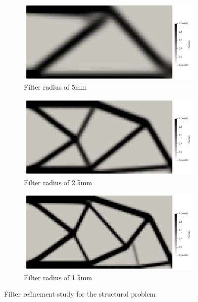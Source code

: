 \begin{figure}[ht]
  \centering
  \begin{subfigure}[b]{0.45\linewidth}
    \includegraphics[width=\linewidth]{figures/chapter_4/FilterRefinement5.png}
    \caption{Filter radius of 5mm}
  \end{subfigure}
  \hfill
  \begin{subfigure}[b]{0.45\linewidth}
    \includegraphics[width=\linewidth]{figures/chapter_4/FilterRefinement25.png}
    \caption{Filter radius of 2.5mm}
  \end{subfigure}
  \begin{subfigure}[b]{0.45\linewidth}
    \includegraphics[width=\linewidth]{figures/chapter_4/FilterRefinement15.png}
    \caption{Filter radius of 1.5mm}
  \end{subfigure}
  \caption{Filter refinement study for the structural problem}
  \label{fig:radius_refinement_solid}
\end{figure}

